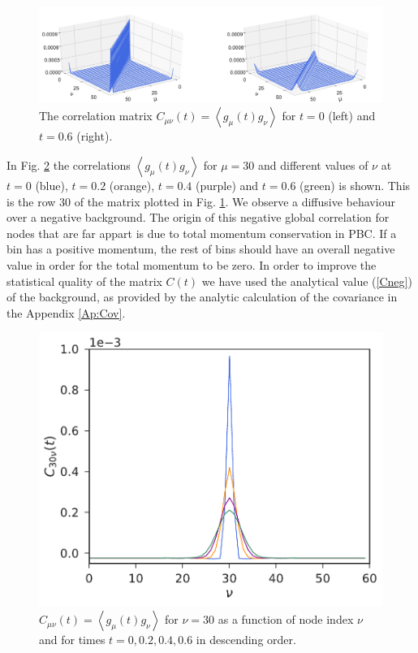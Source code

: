 \documentclass[a4paper,openright,12pt]{book}
\newcommand{\llangle}{\left\langle}
\newcommand{\rrangle}{\right\rangle}
\begin{document}
\begin{figure}[h!]
\centering
\includegraphics[scale=0.4]{Ct-matrix-PBC}
\caption[Correlation matrix $C(t)$ at $t=0$ and $t=0.6$ for PBC system.]{The   correlation    matrix   $C_{\mu\nu}(t)=\llangle
g_{\mu}(t)  g_\nu\rrangle$ for  $t=0$ (left) and $t=0.6$ (right).}
\label{fig:Ct-matrix-PBC}
\end{figure}

In  Fig.    \ref{fig:Ct-mu30nu-PBC}  the   correlations  $\llangle
g_{\mu}(t)  g_\nu\rrangle$ for  $\mu=30$ and  different values  of
$\nu$ at $t=0$ (blue), $t=0.2$ (orange), $t=0.4$ (purple) and $t= 0.6$ (green) is shown.  This is the row 30 of the matrix plotted
in Fig. \ref{fig:Ct-matrix-PBC}.  We  observe a diffusive
behaviour over  a negative  background.  The  origin of  this negative
global  correlation for  nodes that  are far  appart is  due to  total
momentum conservation in PBC.  If a bin has  a positive momentum, the rest of
bins should  have an  overall negative  value in  order for  the total
momentum to  be zero. In order  to improve the statistical  quality of
the matrix  $C(t)$ we have  used the analytical value  (\ref{Cneg}) of
the  background,  as  provided  by the  analytic  calculation  of  the
covariance in the Appendix \ref{Ap:Cov}.

\begin{figure}[h!]
\centering
\includegraphics[scale=0.45]{Ct-mu30nu-PBC}
\caption[$C_{30\nu}(t)$ for PBC system.]{$C_{\mu\nu}(t)=\llangle  g_{\mu}(t) g_\nu\rrangle$  for $\nu=30$
 as a  function of node index  $\nu$ and for times $t=0, 0.2, 0.4, 0.6$ in descending order.}
 \label{fig:Ct-mu30nu-PBC} 
\end{figure}
\end{document}
